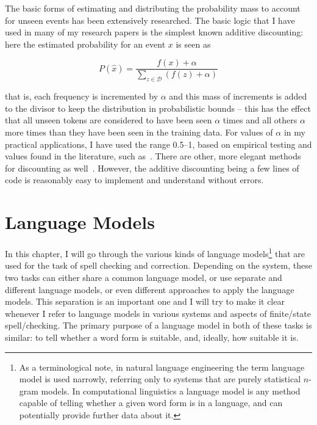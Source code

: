 \documentclass[officiallayout,final]{unihelcompling}
\begin{document}
The basic forms of estimating and distributing the probability mass to account
for unseen events has been extensively researched. The basic logic that I have
used in many of my research papers is the simplest known additive discounting:
here the estimated probability for an event $x$ is seen as

\begin{equation}
    P(\hat{x}) = \frac{f(x) + \alpha}{\sum_{z \in \mathcal{D}}(f(z) + \alpha)}
\end{equation}

that is, each frequency is incremented by $\alpha$ and this mass
of increments is added to the divisor to keep the distribution in probabilistic
bounds -- this has the effect that all unseen tokens are considered to have been
seen $\alpha$ times and all others $\alpha$ more times than they have been seen
in the training data.  For values of $\alpha$ in my practical applications, I
have used the range 0.5--1, based on empirical testing and values found in the
literature, such as~\citet{manning1999foundations}. There are other, more
elegant methods for discounting as well~\citep{chen1999empirical}. However,
the additive discounting being a few lines of code is reasonably easy to
implement and understand without errors.


\chapter{Language Models}
\label{chap:language-models}

In this chapter, I will go through the various kinds of
\glspl{language model}\footnote{As a terminological note, in \gls{natural language
    engineering} the term language model is used narrowly, referring only
    to systems that are purely statistical \(n\)-gram models. In
    computational linguistics a language model is any method capable of
    telling whether a given word form is in a language, and can potentially
    provide further data about it.} that are
used for the task of spell checking and correction.  Depending on the system,
these two tasks can either share a common language model, or use separate and
different language models, or even different approaches to apply the language
models. This separation is an important one and I will try to make it clear
whenever I refer to language models in various systems and aspects of
finite\-/state spell\-/checking.  The primary purpose of a language model in
both of these tasks is similar: to tell whether a word form is suitable, and,
ideally, how suitable it is.
\end{document}
